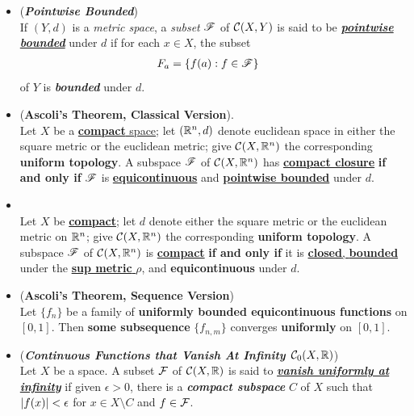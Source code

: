 \documentclass[11pt]{article}
\begin{document}
\begin{itemize}
\item \begin{definition} (\emph{\textbf{Pointwise Bounded}})\\
If $(Y, d)$ is a \emph{metric space}, a \emph{subset} ${\mathscr F}$ of ${\mathcal C}(X, Y)$ is said to be \underline{\emph{\textbf{pointwise bounded}}} under $d$ if for each $x \in X$, the subset
\begin{align*}
F_{a} &= \left\{f(a): f\in {\mathscr F}\right\}
\end{align*}
of $Y$ is \emph{\textbf{bounded}} under $d$.
\end{definition}

\item \begin{theorem} (\textbf{Ascoli's Theorem, Classical Version}). \citep{munkres2000topology}\\
Let $X$ be a \underline{\textbf{compact} space}; let $({\mathbb R}^n , d)$ denote euclidean space in either the square metric or the euclidean metric; give ${\mathcal C}(X, {\mathbb R}^n)$ the corresponding \textbf{uniform topology}. A subspace ${\mathscr F}$ of ${\mathcal C}(X, {\mathbb R}^n)$ has \underline{\textbf{compact closure}} \textbf{if and only if} ${\mathscr F}$ is \underline{\textbf{equicontinuous}} and \underline{\textbf{pointwise bounded}} under $d$.
\end{theorem}



\item \begin{corollary}\citep{munkres2000topology}\\
Let $X$  be  \underline{\textbf{compact}}; let $d$ denote either the square metric or the euclidean metric on ${\mathbb R}^n$; give ${\mathcal C}(X, {\mathbb R}^n)$ the corresponding \textbf{uniform topology}. A subspace ${\mathscr F}$ of ${\mathcal C}(X, {\mathbb R}^n)$ is \underline{\textbf{compact}} \textbf{if and only if} it is \underline{\textbf{closed}, \textbf{bounded}} under the \underline{\textbf{sup metric} $\rho$}, and \textbf{equicontinuous} under $d$.
\end{corollary}

\item \begin{corollary} (\textbf{Ascoli's Theorem, Sequence Version}) \citep{reed1980methods}\\
Let $\{f_n\}$ be a family of \textbf{uniformly bounded equicontinuous functions} on $[0, 1]$. Then \textbf{some subsequence} $\{f_{n,m}\}$ converges \textbf{uniformly} on $[0, 1]$.
\end{corollary}

\item \begin{definition} (\emph{\textbf{Continuous Functions that Vanish At Infinity ${\mathcal C}_0(X, {\mathbb R})$}}) \\
Let $X$ be a space. A subset ${\mathcal F}$ of ${\mathcal C}(X, {\mathbb R})$ is said to \underline{\emph{\textbf{vanish uniformly at infinity}}} if given $\epsilon > 0$, there is a \emph{\textbf{compact subspace}} $C$ of $X$ such that $\left\lvert f(x) \right\rvert < \epsilon$  for $x \in X \setminus C$ and $f \in {\mathcal F}$. 


\end{definition}
\end{itemize}
\end{document}
